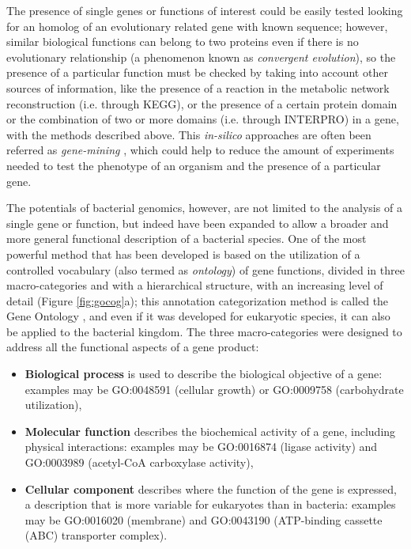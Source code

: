 The presence of single genes or functions of interest could be easily tested looking for an homolog of an evolutionary related gene with known sequence; however, similar biological functions can belong to two proteins even if there is no evolutionary relationship (a phenomenon known as \textit{convergent evolution}), so the presence of a particular function must be checked by taking into account other sources of information, like the presence of a reaction in the metabolic network reconstruction (i.e. through KEGG), or the presence of a certain protein domain or the combination of two or more domains (i.e. through INTERPRO) in a gene, with the methods described above. This \textit{in-silico} approaches are often been referred as \textit{gene-mining} \cite{li2004gene}\cite{du2008functional}, which could help to reduce the amount of experiments needed to test the phenotype of an organism and the presence of a particular gene.

The potentials of bacterial genomics, however, are not limited to the analysis of a single gene or function, but indeed have been expanded to allow a broader and more general functional description of a bacterial species. One of the most powerful method that has been developed is based on the utilization of a controlled vocabulary (also termed as \textit{ontology}) of gene functions, divided in three macro-categories and with a hierarchical structure, with an increasing level of detail (Figure \ref{fig:gocog}a); this annotation categorization method is called the Gene Ontology \cite{ashburner2000gene}, and even if it was developed for eukaryotic species, it can also be applied to the bacterial kingdom. The three macro-categories were designed to address all the functional aspects of a gene product:

\begin{itemize}
\item \textbf{Biological process} is used to describe the biological objective of a gene: examples may be GO:0048591 (cellular growth) or GO:0009758 (carbohydrate utilization),
\item \textbf{Molecular function} describes the 	biochemical activity of a gene, including physical interactions: examples may be GO:0016874 (ligase activity) and GO:0003989 (acetyl-CoA carboxylase activity),
\item \textbf{Cellular component} describes where the function of the gene is expressed, a description that is more variable for eukaryotes than in bacteria: examples may be GO:0016020 (membrane) and GO:0043190 (ATP-binding cassette (ABC) transporter complex).
\end{itemize}

